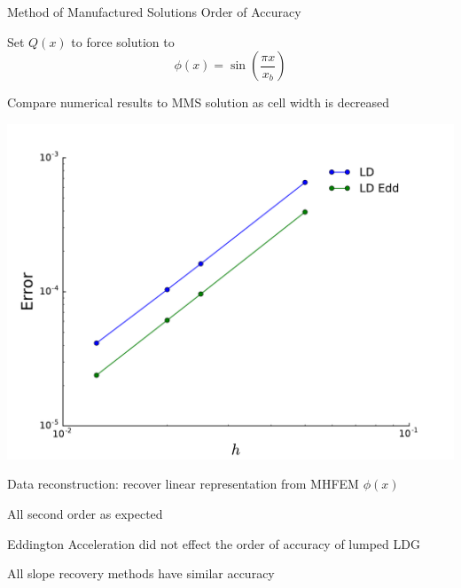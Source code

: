 \documentclass[10pt,draft]{beamer}
\begin{document}
\begin{frame}{Method of Manufactured Solutions Order of Accuracy} 

	\footnotesize
	Set $Q(x)$ to force solution to 
	\begin{equation*}
		\phi(x) = \sin\left(\frac{\pi x}{x_b}\right)
	\end{equation*}

	Compare numerical results to MMS solution as cell width is decreased 

	\pause
	\centerline{\includegraphics[width=.45\paperwidth]{figs/ooa.pdf}}

	\pause
	Data reconstruction: recover linear representation from MHFEM $\phi(x)$

	\pause 
	All second order as expected 

	\pause
	Eddington Acceleration did not effect the order of accuracy of lumped LDG 

	\pause 
	All slope recovery methods have similar accuracy 

\end{frame}
\end{document}
